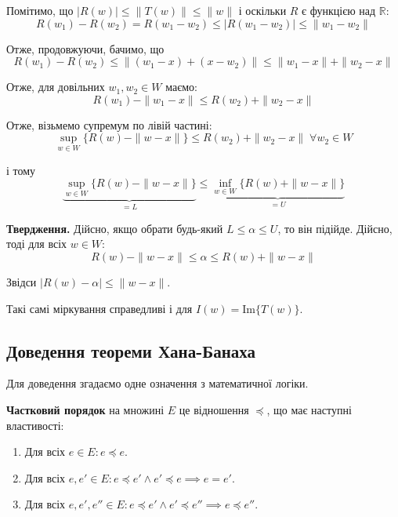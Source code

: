 \documentclass[14pt]{extarticle}
\newcommand{\<}{\langle}
\renewcommand{\>}{\rangle}
\theoremstyle{mystyle}{\newtheorem{definition}{Definition}[section]}
\theoremstyle{mystyle}{\newtheorem{proposition}[definition]{Proposition}}
\theoremstyle{mystyle}{\newtheorem{theorem}[definition]{Theorem}}
\theoremstyle{mystyle}{\newtheorem{lemma}[definition]{Lemma}}
\theoremstyle{mystyle}{\newtheorem{corollary}[definition]{Corollary}}
\theoremstyle{mystyle}{\newtheorem*{remark}{Remark}}
\theoremstyle{mystyle}{\newtheorem*{remarks}{Remarks}}
\theoremstyle{mystyle}{\newtheorem*{example}{Example}}
\theoremstyle{mystyle}{\newtheorem*{examples}{Examples}}
\theoremstyle{definition}{\newtheorem*{exercise}{Exercise}}
\theoremstyle{cstyle}{\newtheorem*{cthm}{}}
\theoremstyle{warn}
\begin{document}
Помітимо, що $|R(w)| \leq \|T(w)\| \leq \|w\|$ і оскільки $R$ є функцією над $\mathbb{R}$:
\begin{equation}
    R(w_1)-R(w_2) = R(w_1-w_2) \leq |R(w_1-w_2)| \leq \|w_1-w_2\|
\end{equation}

Отже, продовжуючи, бачимо, що
\begin{equation}
    R(w_1)-R(w_2) \leq \|(w_1-x)+(x-w_2)\| \leq \|w_1-x\|+\|w_2-x\|
\end{equation}

Отже, для довільних $w_1,w_2 \in W$ маємо:
\begin{equation}
    R(w_1)-\|w_1-x\| \leq R(w_2) + \|w_2-x\|
\end{equation}

Отже, візьмемо супремум по лівій частині:
\begin{equation}
    \sup_{w \in W}\{R(w)-\|w-x\|\} \leq R(w_2) + \|w_2-x\| \; \forall w_2 \in W
\end{equation}

і тому 
\begin{equation}
    \underbrace{\sup_{w \in W}\{R(w)-\|w-x\|\}}_{=L} \leq \underbrace{\inf_{w \in W}\{R(w) + \|w-x\|\}}_{=U}
\end{equation}

\textbf{Твердження.} Дійсно, якщо обрати будь-який $L \leq \alpha \leq U$, то він підійде. Дійсно, тоді для всіх $w \in W$:
\begin{equation}
    R(w)-\|w-x\| \leq \alpha \leq R(w)+\|w-x\|
\end{equation}

Звідси $|R(w)-\alpha|\leq\|w-x\|$. 

Такі самі міркування справедливі і для $I(w) = \text{Im}\{T(w)\}$. 

\subsection{Доведення теореми Хана-Банаха}

Для доведення згадаємо одне означення з математичної логіки.

\begin{definition}
    \textbf{Частковий порядок} на множині $E$ це відношення $\preceq$, що має наступні властивості: 
    \begin{enumerate}
        \item Для всіх $e \in E: e \preceq e$.
        \item Для всіх $e,e' \in E: e \preceq e' \wedge e' \preceq e \implies e=e'$.
        \item Для всіх $e,e',e'' \in E: e \preceq e' \wedge e' \preceq e'' \implies e \preceq e''$.
    \end{enumerate}
\end{definition}
\end{document}
